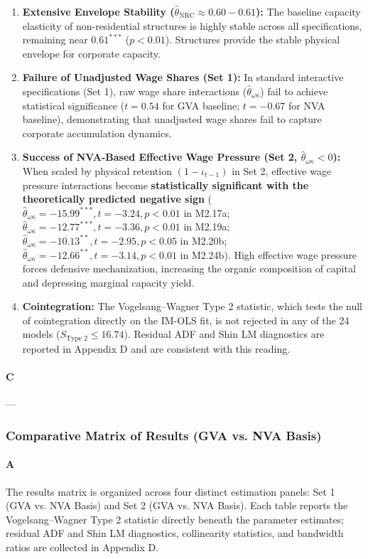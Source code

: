 \begin{enumerate}
	\item \textbf{Extensive Envelope Stability ($\hat{\theta}_{\text{NRC}} \approx 0.60 - 0.61$):} The baseline capacity elasticity of non-residential structures is highly stable across all specifications, remaining near $0.61^{***}$ ($p < 0.01$). Structures provide the stable physical envelope for corporate capacity.
	\item \textbf{Failure of Unadjusted Wage Shares (Set 1):} In standard interactive specifications (Set 1), raw wage share interactions ($\hat{\theta}_{\omega\kappa}$) fail to achieve statistical significance ($t = 0.54$ for GVA baseline; $t = -0.67$ for NVA baseline), demonstrating that unadjusted wage shares fail to capture corporate accumulation dynamics.
	\item \textbf{Success of NVA-Based Effective Wage Pressure (Set 2, $\hat{\theta}_{\omega\kappa} < 0$):} When scaled by physical retention $(1 - \iota_{t-1})$ in Set 2, effective wage pressure interactions become \textbf{statistically significant with the theoretically predicted negative sign} ($\hat{\theta}_{\omega\kappa} = -15.99^{***}, t = -3.24, p < 0.01$ in M2.17a; $\hat{\theta}_{\omega\kappa} = -12.77^{***}, t = -3.36, p < 0.01$ in M2.19a; $\hat{\theta}_{\omega\kappa} = -10.13^{**}, t = -2.95, p < 0.05$ in M2.20b; $\hat{\theta}_{\omega\kappa} = -12.66^{**}, t = -3.14, p < 0.01$ in M2.24b). High effective wage pressure forces defensive mechanization, increasing the organic composition of capital and depressing marginal capacity yield.
	\item \textbf{Cointegration:} The Vogelsang--Wagner Type 2 statistic, which tests the null of cointegration directly on the IM-OLS fit, is not rejected in any of the 24 models ($S_{\text{Type 2}} \le 16.74$). Residual ADF and Shin LM diagnostics are reported in Appendix D and are consistent with this reading.
\end{enumerate}

\paragraph{C}
---

\subsubsection{Comparative Matrix of Results (GVA vs. NVA Basis)}

\paragraph{A}
The results matrix is organized across four distinct estimation panels: Set 1 (GVA vs. NVA Basis) and Set 2 (GVA vs. NVA Basis). Each table reports the Vogelsang--Wagner Type 2 statistic directly beneath the parameter estimates; residual ADF and Shin LM diagnostics, collinearity statistics, and bandwidth ratios are collected in Appendix D.

